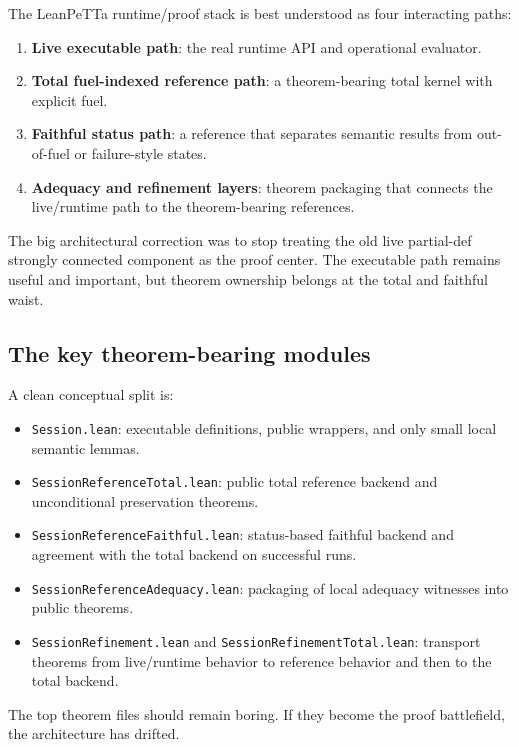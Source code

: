 \documentclass[11pt]{article}
\newcommand{\code}[1]{\texttt{#1}}
\begin{document}
The LeanPeTTa runtime/proof stack is best understood as four interacting paths:

\begin{enumerate}
  \item \textbf{Live executable path}: the real runtime API and operational evaluator.
  \item \textbf{Total fuel-indexed reference path}: a theorem-bearing total kernel with explicit fuel.
  \item \textbf{Faithful status path}: a reference that separates semantic results from out-of-fuel or failure-style states.
  \item \textbf{Adequacy and refinement layers}: theorem packaging that connects the live/runtime path to the theorem-bearing references.
\end{enumerate}

The big architectural correction was to stop treating the old live partial-def strongly connected component as the proof center. The executable path remains useful and important, but theorem ownership belongs at the total and faithful waist.

\subsection{The key theorem-bearing modules}

A clean conceptual split is:

\begin{itemize}
  \item \code{Session.lean}: executable definitions, public wrappers, and only small local semantic lemmas.
  \item \code{SessionReferenceTotal.lean}: public total reference backend and unconditional preservation theorems.
  \item \code{SessionReferenceFaithful.lean}: status-based faithful backend and agreement with the total backend on successful runs.
  \item \code{SessionReferenceAdequacy.lean}: packaging of local adequacy witnesses into public theorems.
  \item \code{SessionRefinement.lean} and \code{SessionRefinementTotal.lean}: transport theorems from live/runtime behavior to reference behavior and then to the total backend.
\end{itemize}

The top theorem files should remain boring. If they become the proof battlefield, the architecture has drifted.
\end{document}
